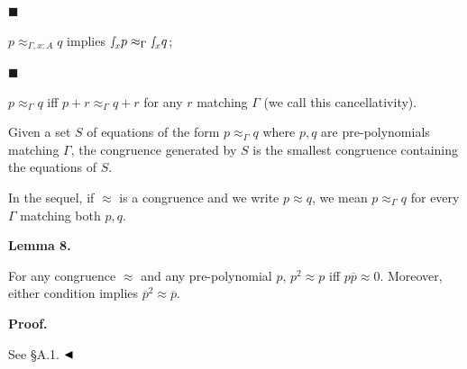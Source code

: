  
 
\par\noindent  $\blacksquare$ 
 
$p\approx_{\Gamma,x:A}q$ implies ${\smallint\!}_{x}p\approx_{\Gamma}{\smallint\!}_{x}q$;\par
 
 
 
\par\noindent  $\blacksquare$ 
 
$p\approx_{\Gamma}q$ iff $p+r\approx_{\Gamma}q+r$ for any $r$ matching $\Gamma$ (we call this cancellativity).\par
 
 
  
Given a set $S$ of equations of the form $p\approx_{\Gamma}q$ where $p,q$ are pre-polynomials matching $\Gamma$, the congruence generated by $S$ is the smallest congruence containing the equations of $S$.\par
 
 
 
In the sequel, if $\approx$ is a congruence and we write $p\approx q$, we mean $p\approx_{\Gamma}q$ for every $\Gamma$ matching both $p,q$.\par
 
 
 
\par\medskip\noindent\textbf{Lemma 8.}\par
 
 
For any congruence $\approx$ and any pre-polynomial $p$, $p^{2}\approx p$ iff $p\overline{p}\approx 0$. Moreover, either condition implies $\overline{p}^{2}\approx\overline{p}$.\par
 
 
 
 
\par\medskip\noindent\textbf{Proof.}\par
 
 
See §A.1. $\hfill\blacktriangleleft$\par
 
